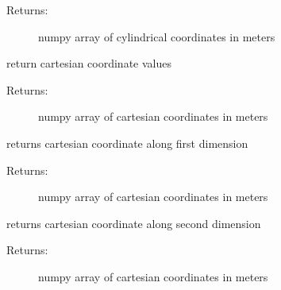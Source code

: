 \documentclass[letterpaper,10pt,english]{sphinxmanual}
\begin{document}
\begin{fulllineitems}
\begin{fulllineitems}
\begin{description}
\begin{description}
\end{description}

\item[{Returns:}] \leavevmode
numpy array of cylindrical coordinates in meters

\end{description}

\end{fulllineitems}


\begin{fulllineitems}
\label{TRIPPy:TRIPPy.geometry.Vec.x}
return cartesian coordinate values
\begin{description}
\item[{Returns:}] \leavevmode
numpy array of cartesian coordinates in meters

\end{description}

\end{fulllineitems}


\begin{fulllineitems}
\label{TRIPPy:TRIPPy.geometry.Vec.x0}
returns cartesian coordinate along first dimension
\begin{description}
\item[{Returns:}] \leavevmode
numpy array of cartesian coordinates in meters

\end{description}

\end{fulllineitems}


\begin{fulllineitems}
\label{TRIPPy:TRIPPy.geometry.Vec.x1}
returns cartesian coordinate along second dimension
\begin{description}
\item[{Returns:}] \leavevmode
numpy array of cartesian coordinates in meters

\end{description}

\end{fulllineitems}



\end{fulllineitems}
\end{document}
